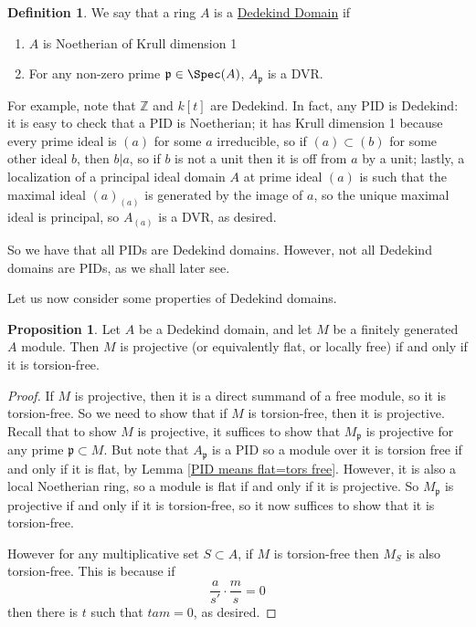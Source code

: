 \documentclass[12 pt]{article}
\theoremstyle{definition}
\newtheorem{propn}[thm]{Proposition}
\newtheorem{defn}[thm]{Definition}
\renewcommand{\(}{\left(}
\renewcommand{\)}{\right)}
\newcommand\zz{\mathbb{Z}}
\newcommand\fp{{\mathfrak p}}
\begin{document}
\begin{defn} We say that a ring $A$ is a \uline{Dedekind Domain} if
\begin{enumerate}
\item $A$ is Noetherian of Krull dimension 1

\item For any non-zero prime $\fp \in \Spec(A)$, $A_\fp$ is a DVR.
\end{enumerate}
\end{defn}

For example, note that $\zz$ and $k[t]$ are Dedekind. In fact, any PID is Dedekind: it is easy to check that a PID is Noetherian; it has Krull dimension 1 because every prime ideal is $(a)$ for some $a$ irreducible, so if $(a) \subset(b)$ for some other ideal $b$, then $b|a$, so if $b$ is not a unit then it is off from $a$ by a unit; lastly, a localization of a principal ideal domain $A$ at prime ideal $(a)$ is such that the maximal ideal $(a)_{(a)}$ is generated by the image of $a$, so the unique maximal ideal is principal, so $A_{(a)}$ is a DVR, as desired.

So we have that all PIDs are Dedekind domains. However, not all Dedekind domains are PIDs, as we shall later see.


Let us now consider some properties of Dedekind domains.

\begin{propn} Let $A$ be a Dedekind domain, and let $M$ be a finitely generated $A$ module. Then
$M$ is projective (or equivalently flat, or locally free) if and only if it is torsion-free.
\label{Dedekind means projective=tors free}
\end{propn}
\begin{proof}
If $M$ is projective, then it is a direct summand of a free module, so it is torsion-free. So we need to show that if $M$ is torsion-free, then it is projective. Recall that to show $M$ is projective, it suffices to show that $M_\fp$ is projective for any prime $\fp \subset M$. But note that $A_\fp$ is a PID so a module over it is torsion free if and only if it is flat, by Lemma \ref{PID means flat=tors free}. However, it is also a local Noetherian ring, so a module is flat if and only if it is projective. So $M_\fp$ is projective if and only if it is torsion-free, so it now suffices to show that it is torsion-free.

However for any multiplicative set $S \subset A$, if $M$ is torsion-free then $M_S$ is also torsion-free. This is because if
\[\frac{a}{s'} \cdot \frac{m}{s}=0\]
then there is $t$ such that $tam=0$,
as desired.
\end{proof}
\end{document}
